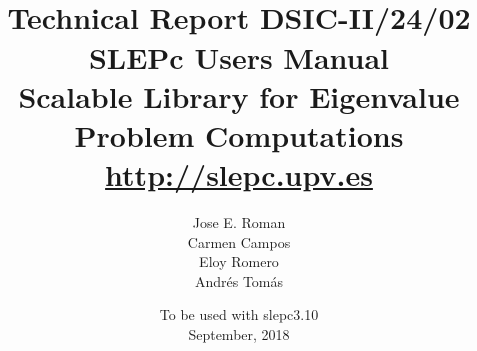\documentclass[titlepage,10pt,a4paper]{book}
\newcommand{\slepcversion}{3.10}
\newcommand{\slepchome}{http://slepc.upv.es}
\newcommand{\packnoi}[1]{{\sc #1}\xspace}
\newcommand{\slepc}{\texorpdfstring{\packnoi{slep\rm c}}{{SLEPc}}}
\begin{document}
\title{
 	\vspace*{-1cm}
	\\[2cm]
	\normalsize Technical Report DSIC-II/24/02
	\\[2cm]
	\vspace*{6mm}
	{\Large\bf\sffamily
	SLEPc Users Manual\\[2mm]}
	{\large\bf\sffamily
	Scalable Library for Eigenvalue Problem Computations}\\[2mm]
	\vspace*{6mm}
	\vspace*{6mm}
	\url{\slepchome}
	\\[6mm]
}

\author{
  Jose E. Roman\\
  Carmen Campos\\
  Eloy Romero\\
  Andr\'es Tom\'as\\[3mm]
}

\date{
	To be used with \slepc \slepcversion\\
	September, 2018
}

\hypersetup{pageanchor=false}
\begin{titlepage}
\maketitle
\end{titlepage}

\setlength{\textheight}{18cm}
\setlength{\oddsidemargin}{0.6cm}
\setlength{\evensidemargin}{0.6cm}
\setlength{\footskip}{2cm}
\setlength{\voffset}{1.3cm}
\end{document}
